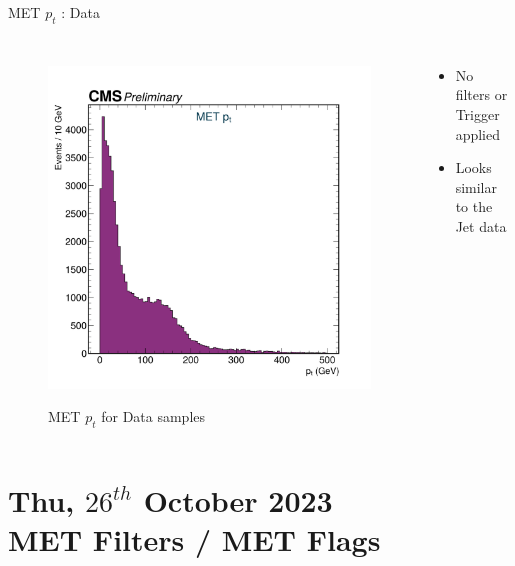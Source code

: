 \documentclass[10pt,xcolor=dvipsnames]{beamer}
\begin{document}
    
   \begin{frame}[fragile]{MET $p_t$ : Data} 
    \begin{columns}
    \begin{figure} 
    \centering 
     \includegraphics[width=1\textwidth]{../Archive/KinemPlots/METData.png }
    \label{METData} 
    \caption{MET $p_t$ for Data samples}
    \end{figure} 
    \begin{itemize} 
    \raggedright 
    \small
    \item No filters or Trigger applied
    \item Looks similar to the Jet data
    \end{itemize}
    \end{columns} 
    \end{frame}


\section[MET Filters ]{\small{Thu, $26^{th}$ October 2023 } \\ MET Filters / MET Flags}
\end{document}
